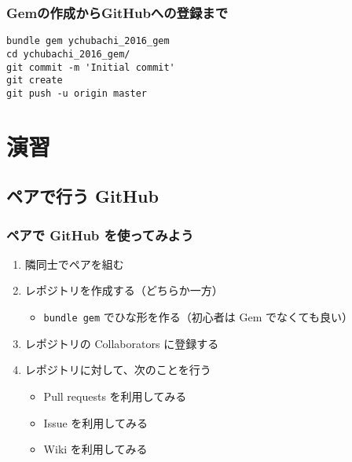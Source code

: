 \documentclass[a4paper,twoside,twocolumn]{bxjsarticle}
\begin{document}
\subsubsection{Gemの作成からGitHubへの登録まで}
\label{sec-3-1-8}

\begin{verbatim}
bundle gem ychubachi_2016_gem
cd ychubachi_2016_gem/
git commit -m 'Initial commit'
git create
git push -u origin master
\end{verbatim}

\section{演習}
\label{sec-4}
\subsection{ペアで行う GitHub}
\label{sec-4-1}
\subsubsection{ペアで GitHub を使ってみよう}
\label{sec-4-1-1}
\begin{enumerate}
\item 隣同士でペアを組む
\item レポジトリを作成する（どちらか一方）
\begin{itemize}
\item \texttt{bundle gem} でひな形を作る（初心者は Gem でなくても良い）
\end{itemize}
\item レポジトリの Collaborators に登録する
\item レポジトリに対して、次のことを行う
\begin{itemize}
\item Pull requests を利用してみる
\item Issue を利用してみる
\item Wiki を利用してみる
\end{itemize}
\end{enumerate}
\end{document}
